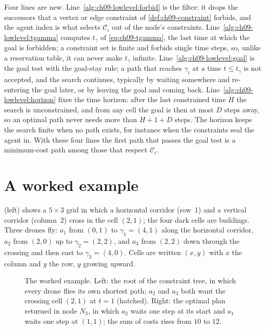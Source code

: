 Four lines are new. Line~\ref{alg:ch09-lowlevel:forbid} is the filter: it drops
the successors that a vertex or edge constraint of \cref{def:ch09-constraint}
forbids, and the agent index is what selects $\mathcal{C}_i$ out of the node's
constraints. Line~\ref{alg:ch09-lowlevel:tgamma} computes $t_\gamma$ of
\cref{eq:ch09-tgamma}, the last time at which the goal is forbidden; a
constraint set is finite and forbids single time steps, so, unlike a
reservation table, it can never make $t_\gamma$ infinite.
Line~\ref{alg:ch09-lowlevel:goal} is the goal test with the goal-stay rule; a
path that reaches $\gamma_i$ at a time $t \le t_\gamma$ is not accepted, and the
search continues, typically by waiting somewhere and re-entering the goal later,
or by leaving the goal and coming back. Line~\ref{alg:ch09-lowlevel:horizon}
fixes the time horizon: after the last constrained time $H$ the search is
unconstrained, and from any cell the goal is then at most $D$ steps away, so an
optimal path never needs more than $H + 1 + D$ steps. The horizon keeps the
search finite when no path exists, for instance when the constraints seal the
agent in. With these four lines the first path that passes the goal test is a
minimum-cost path among those that respect $\mathcal{C}_i$.

\section{A worked example}
\label{sec:ch09-example}

\begin{example}
\label{ex:ch09-crossing}
 (left) shows a $5 \times 3$ grid in which a
horizontal corridor (row~1) and a vertical corridor (column~2) cross in the
cell $(2,1)$; the four dark cells are buildings. Three drones fly:
$a_1$ from $(0,1)$ to $\gamma_1 = (4,1)$ along the horizontal corridor,
$a_2$ from $(2,0)$ up to $\gamma_2 = (2,2)$, and $a_3$ from $(2,2)$ down
through the crossing and then east to $\gamma_3 = (4,0)$. Cells are written
$(x, y)$ with $x$ the column and $y$ the row, $y$ growing upward.
\end{example}

\begin{figure}[tb]
  \centering
  \caption{The worked example. Left: the root of the constraint tree, in
    which every drone flies its own shortest path; $a_2$ and $a_3$ both want
    the crossing cell $(2,1)$ at $t = 1$ (hatched). Right: the optimal plan
    returned in node $N_3$, in which $a_2$ waits one step at its start and
    $a_1$ waits one step at $(1,1)$; the sum of costs rises from $10$ to
    $12$.}
  \label{fig:ch09-example}
\end{figure}

